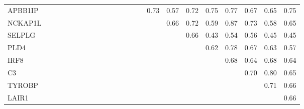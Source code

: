 \begin{longtable}{lrrrrrrrrrrrrrrrrrrrrrr}
APBB1IP &            &            &              &              &             &             &            &            &             &            &              &              &           &               &          0.73 &         0.57 &       0.72 &       0.75 &     0.77 &         0.67 &        0.65 &        0.75 \\
NCKAP1L &            &            &              &              &             &             &            &            &             &            &              &              &           &               &               &         0.66 &       0.72 &       0.59 &     0.87 &         0.73 &        0.58 &        0.65 \\
SELPLG  &            &            &              &              &             &             &            &            &             &            &              &              &           &               &               &              &       0.66 &       0.43 &     0.54 &         0.56 &        0.45 &        0.45 \\
PLD4    &            &            &              &              &             &             &            &            &             &            &              &              &           &               &               &              &            &       0.62 &     0.78 &         0.67 &        0.63 &        0.57 \\
IRF8    &            &            &              &              &             &             &            &            &             &            &              &              &           &               &               &              &            &            &     0.68 &         0.64 &        0.68 &        0.64 \\
C3      &            &            &              &              &             &             &            &            &             &            &              &              &           &               &               &              &            &            &          &         0.70 &        0.80 &        0.65 \\
TYROBP  &            &            &              &              &             &             &            &            &             &            &              &              &           &               &               &              &            &            &          &              &        0.71 &        0.66 \\
LAIR1   &            &            &              &              &             &             &            &            &             &            &              &              &           &               &               &              &            &            &          &              &             &        0.66 \\
\end{longtable}


